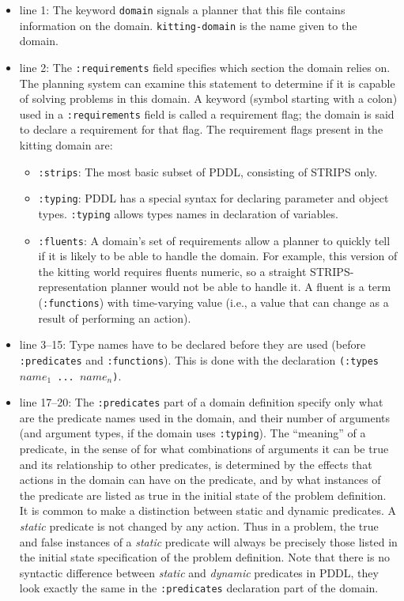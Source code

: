 \begin{itemize}
\item line 1: The keyword \texttt{domain} signals a planner that this file contains information on the domain. \texttt{kitting-domain} is the name given to the domain.
\item line 2: The \texttt{:requirements} field specifies which section the domain relies on. The planning system can examine this statement to determine if it is capable of solving problems in this domain. A keyword (symbol starting with a colon) used in a \texttt{:requirements} field is called a requirement flag; the domain is said to declare a requirement for that flag. The requirement flags present in the kitting domain are:
\begin{itemize}
\item \texttt{:strips}: The most basic subset of PDDL, consisting of STRIPS only.
\item \texttt{:typing}: PDDL has a special syntax for declaring parameter and object types. \texttt{:typing} allows types names in declaration of variables.
\item \texttt{:fluents}: A domain's set of requirements allow a planner to quickly tell if it is likely to be able
to handle the domain. For example, this version of the kitting world requires fluents numeric, so a straight STRIPS-representation planner would not be able to handle it. A fluent is a term (\texttt{:functions}) with time-varying value (i.e., a value that can change as a result of performing an action).
\end{itemize}
\item line 3--15:  Type names have to be declared before they are used (before \texttt{:predicates} and \texttt{:functions}). This is done with the declaration \texttt{(:types $name_1$ ... $name_n$)}.
\item line 17--20: The \texttt{:predicates} part of a domain definition specify only what are the predicate names used in the domain, and their number of arguments (and argument types, if the domain uses \texttt{:typing}). The ``meaning'' of a predicate, in the sense of for what combinations of arguments it can be true and its relationship to other predicates, is determined by the effects that actions in the domain can have on the predicate, and by what instances of the predicate are listed as true in the initial state of the problem definition.\\
    It is common to make a distinction between static and dynamic predicates. A \textit{static} predicate is not changed by any action. Thus in a problem, the true and false instances of a \textit{static} predicate will always be precisely those listed in the initial state specification of the problem definition. Note that there is no syntactic difference between \textit{static} and \textit{dynamic} predicates in PDDL, they look exactly the same in the \texttt{:predicates} declaration part of the domain.\\

\end{itemize}
